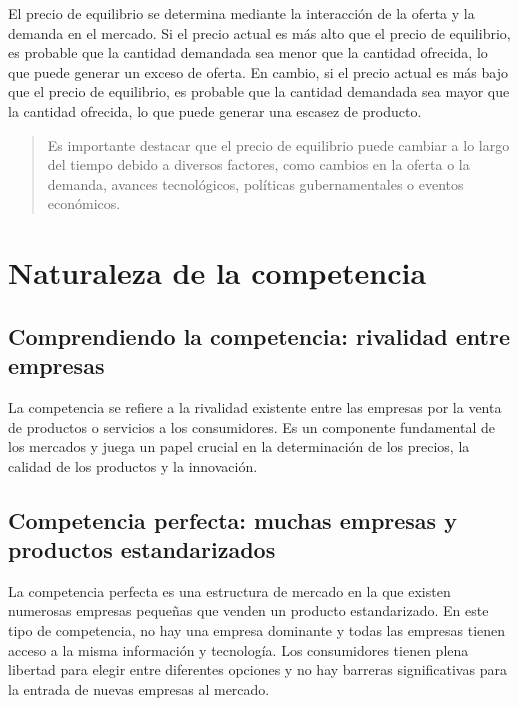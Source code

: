 \documentclass[
  letterpaper,
  DIV=11,
  numbers=noendperiod]{scrartcl}
\begin{document}
El precio de equilibrio se determina mediante la interacción de la
oferta y la demanda en el mercado. Si el precio actual es más alto que
el precio de equilibrio, es probable que la cantidad demandada sea menor
que la cantidad ofrecida, lo que puede generar un exceso de oferta. En
cambio, si el precio actual es más bajo que el precio de equilibrio, es
probable que la cantidad demandada sea mayor que la cantidad ofrecida,
lo que puede generar una escasez de producto.

\begin{quote}
Es importante destacar que el precio de equilibrio puede cambiar a lo
largo del tiempo debido a diversos factores, como cambios en la oferta o
la demanda, avances tecnológicos, políticas gubernamentales o eventos
económicos.
\end{quote}

\hypertarget{naturaleza-de-la-competencia}{%
\section{Naturaleza de la
competencia}\label{naturaleza-de-la-competencia}}

\hypertarget{comprendiendo-la-competencia-rivalidad-entre-empresas}{%
\subsection{Comprendiendo la competencia: rivalidad entre
empresas}\label{comprendiendo-la-competencia-rivalidad-entre-empresas}}

La competencia se refiere a la rivalidad existente entre las empresas
por la venta de productos o servicios a los consumidores. Es un
componente fundamental de los mercados y juega un papel crucial en la
determinación de los precios, la calidad de los productos y la
innovación.

\hypertarget{competencia-perfecta-muchas-empresas-y-productos-estandarizados}{%
\subsection{Competencia perfecta: muchas empresas y productos
estandarizados}\label{competencia-perfecta-muchas-empresas-y-productos-estandarizados}}

La competencia perfecta es una estructura de mercado en la que existen
numerosas empresas pequeñas que venden un producto estandarizado. En
este tipo de competencia, no hay una empresa dominante y todas las
empresas tienen acceso a la misma información y tecnología. Los
consumidores tienen plena libertad para elegir entre diferentes opciones
y no hay barreras significativas para la entrada de nuevas empresas al
mercado.
\end{document}
